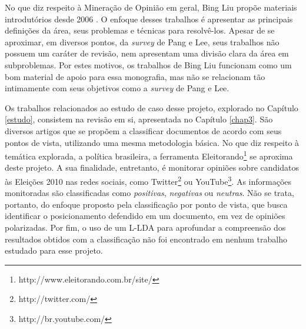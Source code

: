 No que diz respeito à Mineração de Opinião em geral, Bing Liu propõe materiais introdutórios desde 2006 \cite{bingliu} \cite{handbook-liu}. O enfoque desses trabalhos é apresentar as principais definições da área, seus problemas e técnicas para resolvê-los. Apesar de se aproximar, em diversos pontos, da \emph{survey} de Pang e Lee, seus trabalhos não possuem um caráter de revisão, nem apresentam uma divisão clara da área em subproblemas. Por estes motivos, os trabalhos de Bing Liu funcionam como um bom material de apoio para essa monografia, mas não se relacionam tão intimamente com seus objetivos como a \emph{survey} de Pang e Lee.

Os trabalhos relacionados ao estudo de caso desse projeto, explorado no Capítulo \ref{estudo}, consistem na revisão em si, apresentada no Capítulo \ref{chap3}. São diversos artigos que se propõem a classificar documentos de acordo com seus pontos de vista, utilizando uma mesma metodologia básica. No que diz respeito à temática explorada, a política brasileira, a ferramenta Eleitorando\footnote{http://www.eleitorando.com.br/site/} se aproxima deste projeto. A sua finalidade, entretanto, é monitorar opiniões sobre candidatos às Eleições 2010 nas redes sociais, como Twitter\footnote{http://twitter.com/} ou YouTube\footnote{http://br.youtube.com/}. As informações monitoradas são classificadas como \emph{positivas}, \emph{negativas} ou \emph{neutras}. Não se trata, portanto, do enfoque proposto pela classificação por ponto de vista, que busca identificar o posicionamento defendido em um documento, em vez de opiniões polarizadas. Por fim, o uso de um L-LDA para aprofundar a compreensão dos resultados obtidos com a classificação não foi encontrado em nenhum trabalho estudado para esse projeto.     
